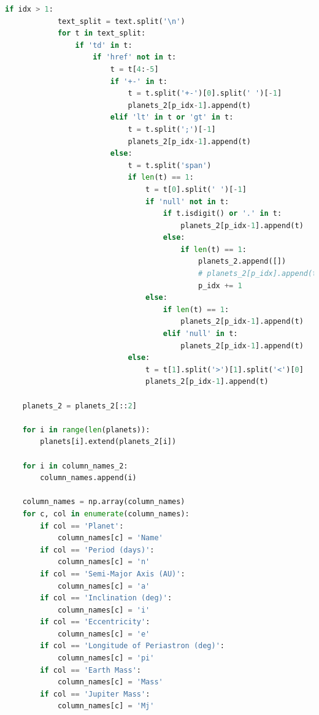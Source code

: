 \documentclass[11pt, oneside]{article}   	%
\begin{document}
\begin{lstlisting}[language=Python, caption={Extracting data from \href{https://exoplanetarchive.ipac.caltech.edu/}{Nasa Exoplanet Archive}}]
        if idx > 1:
            text_split = text.split('\n')
            for t in text_split:
                if 'td' in t:
                    if 'href' not in t:
                        t = t[4:-5]
                        if '+-' in t:
                            t = t.split('+-')[0].split(' ')[-1]
                            planets_2[p_idx-1].append(t)
                        elif 'lt' in t or 'gt' in t:
                            t = t.split(';')[-1]
                            planets_2[p_idx-1].append(t)
                        else:
                            t = t.split('span')
                            if len(t) == 1:
                                t = t[0].split(' ')[-1]
                                if 'null' not in t:
                                    if t.isdigit() or '.' in t:
                                        planets_2[p_idx-1].append(t)
                                    else:
                                        if len(t) == 1:
                                            planets_2.append([])
                                            # planets_2[p_idx].append(t)
                                            p_idx += 1
                                else:
                                    if len(t) == 1:
                                        planets_2[p_idx-1].append(t)
                                    elif 'null' in t:
                                        planets_2[p_idx-1].append(t)
                            else:
                                t = t[1].split('>')[1].split('<')[0]
                                planets_2[p_idx-1].append(t)

    planets_2 = planets_2[::2]

    for i in range(len(planets)):
        planets[i].extend(planets_2[i])
    
    for i in column_names_2:
        column_names.append(i)
   
    column_names = np.array(column_names)
    for c, col in enumerate(column_names):
        if col == 'Planet':
            column_names[c] = 'Name'
        if col == 'Period (days)':
            column_names[c] = 'n'
        if col == 'Semi-Major Axis (AU)':
            column_names[c] = 'a'
        if col == 'Inclination (deg)':
            column_names[c] = 'i'
        if col == 'Eccentricity':
            column_names[c] = 'e'
        if col == 'Longitude of Periastron (deg)':
            column_names[c] = 'pi'
        if col == 'Earth Mass':
            column_names[c] = 'Mass'
        if col == 'Jupiter Mass':
            column_names[c] = 'Mj'


\end{lstlisting}
\end{document}
